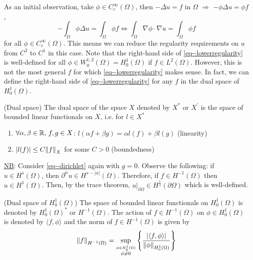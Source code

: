 \documentclass[11pt]{article}
\begin{document}
			\noindent As an initial observation, take $\phi\in C^\infty_c(\Omega)$, then $-\Delta u=f$ in $\Omega$ $\Longrightarrow$ $-\phi\Delta u=\phi f$,
			\begin{equation}\label{eq--lowerregularity}
				-\int_{\Omega}\phi\Delta u=\int_{\Omega}\phi f\Longleftrightarrow \int_{\Omega}\nabla\phi\cdot\nabla u=\int_{\Omega}\phi f
			\end{equation}
			for all $\phi\in C^\infty_c(\Omega)$. This means we can reduce the regularity requirements on $u$ from $C^2$ to $C^1$ in this case. Note that the right-hand side of \eqref{eq--lowerregularity} is well-defined for all $\phi\in W^{1,2}_0(\Omega)=H^1_0(\Omega)$ if $f\in L^2(\Omega)$. However, this is not the most general $f$ for which \eqref{eq--lowerregularity} makes sense. In fact, we can define the right-hand side of \eqref{eq--lowerregularity} for any $f$ in the dual space of $H^1_0(\Omega)$.

			\begin{defi}
				(Dual space) The dual space of the space $X$ denoted by $X^\ast$ or $X^\prime$ is the space of bounded linear functionals on $X$, i.e. for $l\in X^\ast$
				\begin{enumerate}
					\item $\forall\alpha, \beta\in\mathbb{R},\,f,g\in X$: $l(\alpha f+ \beta g)=\alpha l(f)+\beta l(g)$ (linearity)
					\item $|l(f)|\le C\norm{f}_X$ for some $C>0$ (boundedness)
				\end{enumerate}
			\end{defi}

			\noindent\underline{NB}: Consider \eqref{eq--dirichlet} again with $g=0$. Observe the following: if $u\in H^s(\Omega)$, then $\partial^\alpha u\in H^{s-|\alpha|}(\Omega)$. Therefore, if $f\in H^{-1}(\Omega)$ then $u\in H^1(\Omega)$. Then, by the trace theorem, $u|_{\partial\Omega}\in H^{\frac{1}{2}}(\partial\Omega)$ which is well-defined.

			\begin{defi}(Dual space of $H^{1}_0(\Omega)$)
				The space of bounded linear functionals on $H^1_0(\Omega)$ is denoted by $H^1_0(\Omega)^\ast$ or $H^{-1}(\Omega)$. The action of $f\in H^{-1}(\Omega)$ on $\phi\in H^1_0(\Omega)$ is denoted by $\langle f,\phi\rangle$ and the norm of $f\in H^{-1}(\Omega)$ is given by
				\begin{equation*}
					\norm{f}_{H^{-1}(\Omega)}=\sup_{\stackrel{\phi\in H^1_0(\Omega)}{\phi\neq0}}\left\{\frac{|\langle f,\phi\rangle|}{\norm{\phi}_{H^1_0(\Omega)}}\right\}
				\end{equation*}
			\end{defi}
\end{document}
